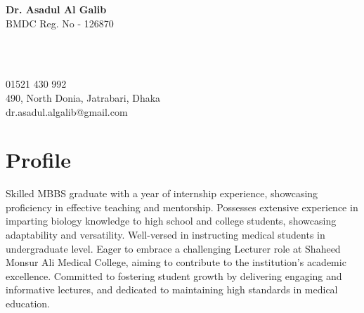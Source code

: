 \documentclass[a4paper,11pt]{article}
\begin{document}
\begin{minipage}[t][3cm]{1.2\textwidth}
    \raggedright
  \begin{minipage}[h][2.6cm][h]{0.38\textwidth}
    {\huge\bfseries\color{black}Dr. Asadul Al Galib}\\
    \large{BMDC Reg. No - 126870}
  \end{minipage}
  \begin{minipage}[h][2.6cm][h]{0.03\textwidth}
      \faPhone\\
      \faMapMarker\\
      \faEnvelopeO
  \end{minipage}
  \begin{minipage}[h][2.6cm][h]{0.28\textwidth}
      01521 430 992\\
      490, North Donia, Jatrabari, Dhaka\\
      dr.asadul.algalib@gmail.com
  \end{minipage}
\end{minipage} 
\begin{minipage}[t][5.6cm]{0.98\textwidth}
  \section*{Profile}
  Skilled MBBS graduate with a year of internship experience, showcasing proficiency in effective teaching and mentorship. 
  Possesses extensive experience in imparting biology knowledge to high school and college students, showcasing adaptability and versatility. 
  Well-versed in instructing medical students in undergraduate level. 
  Eager to embrace a challenging Lecturer role at Shaheed Monsur Ali Medical College, aiming to contribute to the institution's academic excellence. 
  Committed to fostering student growth by delivering engaging and informative lectures, and dedicated to maintaining high standards in medical education.
\end{minipage}
\end{document}
